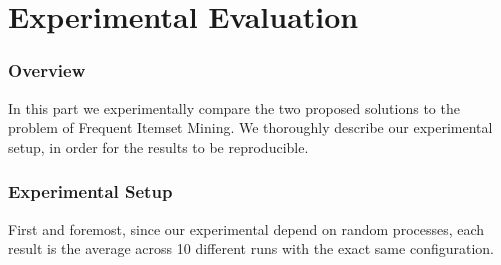 \documentclass[11pt]{sigplanconf}
\begin{document}


\cleardoublepage
\part{Experimental Evaluation}\label{part2}

\section{Overview}
In this part we experimentally compare the two proposed solutions to the problem of Frequent Itemset Mining.
We thoroughly describe our experimental setup, in order for the results to be reproducible.

\section{Experimental Setup}
First and foremost, since our experimental depend on random processes, each result is the average across 10 different runs with the exact same configuration.
\end{document}
